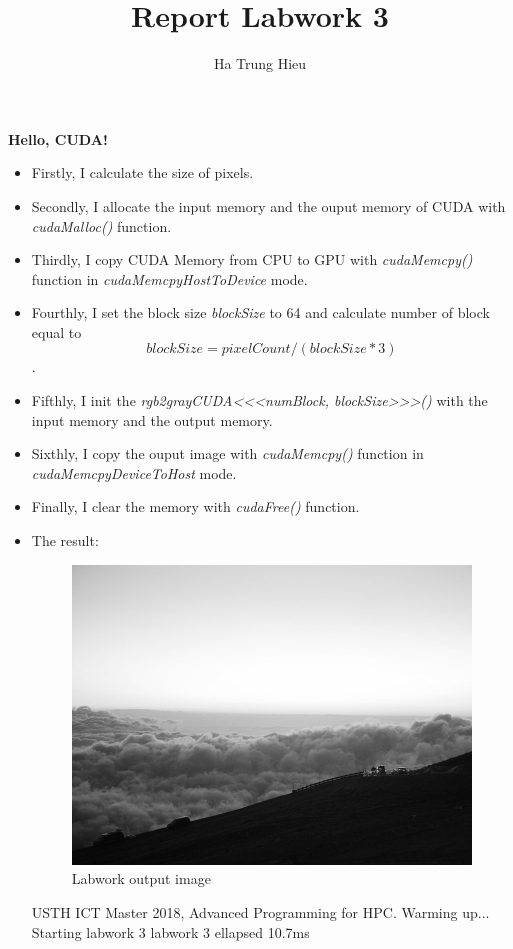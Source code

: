 \documentclass{article}
\title{Report Labwork 3}
\author{Ha Trung Hieu}
\begin{document}
\maketitle

\textbf{Hello, CUDA!}

\begin{itemize}
	\item Firstly, I calculate the size of pixels.
		
	\item Secondly, I allocate the input memory and the ouput memory of CUDA with \textit{cudaMalloc()} function.
	\item Thirdly, I copy CUDA Memory from CPU to GPU with \textit{cudaMemcpy()} function in \textit{cudaMemcpyHostToDevice} mode.
	\item Fourthly, I set the block size \textit{blockSize} to 64 and calculate number of block equal to \[blockSize = pixelCount / (blockSize * 3)\].
	\item Fifthly, I init the \textit{rgb2grayCUDA<<<numBlock, blockSize>>>()} with the input memory and the output memory.
	\item Sixthly, I copy the ouput image with \textit{cudaMemcpy()} function in \textit{cudaMemcpyDeviceToHost} mode.
	\item Finally, I clear the memory with \textit{cudaFree()} function.
	\item The result:\newline
	\begin{figure}[ht]
	\centering
	\includegraphics[width=.8\textwidth]{labwork3-gpu-out.jpg}
	\caption{Labwork output image}
	\label{fig:cat_laptop}
	\end{figure}
	
	USTH ICT Master 2018, Advanced Programming for HPC.\newline
    Warming up...\newline
    Starting labwork 3\newline
    labwork 3 ellapsed 10.7ms\newline
\end{itemize}
\end{document}
